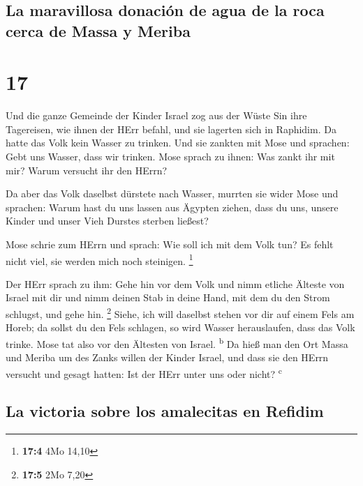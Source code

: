 \hypertarget{la-maravillosa-donaciuxf3n-de-agua-de-la-roca-cerca-de-massa-y-meriba}{%
\subsection{La maravillosa donación de agua de la roca cerca de Massa y
Meriba}\label{la-maravillosa-donaciuxf3n-de-agua-de-la-roca-cerca-de-massa-y-meriba}}

\hypertarget{section-16}{%
\section{17}\label{section-16}}

 Und die ganze Gemeinde der Kinder Israel zog aus der
Wüste Sin ihre Tagereisen, wie ihnen der HErr befahl, und sie lagerten
sich in Raphidim. Da hatte das Volk kein Wasser zu trinken.
 Und sie zankten mit Mose und sprachen: Gebt uns Wasser,
dass wir trinken. Mose sprach zu ihnen: Was zankt ihr mit mir? Warum
versucht ihr den HErrn?

 Da aber das Volk daselbst dürstete nach Wasser, murrten
sie wider Mose und sprachen: Warum hast du uns lassen aus Ägypten
ziehen, dass du uns, unsere Kinder und unser Vieh Durstes sterben
ließest?

 Mose schrie zum HErrn und sprach: Wie soll ich mit dem
Volk tun? Es fehlt nicht viel, sie werden mich noch steinigen.
\footnote{\textbf{17:4} 4Mo 14,10}

 Der HErr sprach zu ihm: Gehe hin vor dem Volk und nimm
etliche Älteste von Israel mit dir und nimm deinen Stab in deine Hand,
mit dem du den Strom schlugst, und gehe hin. \footnote{\textbf{17:5} 2Mo
  7,20}  Siehe, ich will daselbst stehen vor dir auf einem
Fels am Horeb; da sollst du den Fels schlagen, so wird Wasser
herauslaufen, dass das Volk trinke. Mose tat also vor den Ältesten von
Israel. \textsuperscript{b}  Da hieß man den Ort Massa und
Meriba um des Zanks willen der Kinder Israel, und dass sie den HErrn
versucht und gesagt hatten: Ist der HErr unter uns oder nicht?
\textsuperscript{c}

\hypertarget{la-victoria-sobre-los-amalecitas-en-refidim}{%
\subsection{La victoria sobre los amalecitas en
Refidim}\label{la-victoria-sobre-los-amalecitas-en-refidim}}

